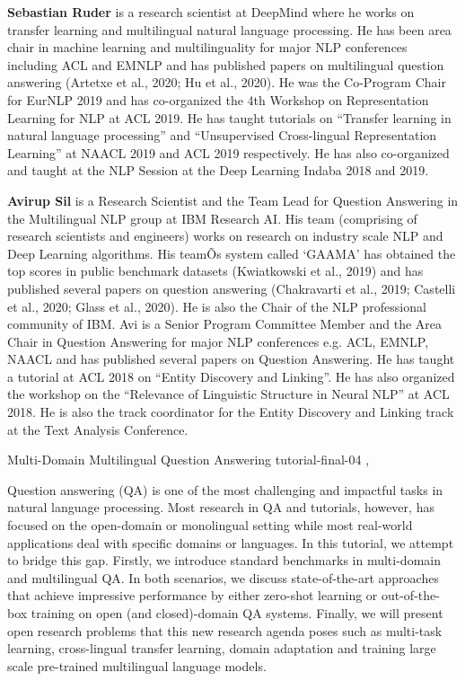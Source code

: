 \begin{bio}
  {\bfseries Sebastian Ruder} is a research scientist at DeepMind where he works on transfer learning and multilingual natural language processing. He has been area chair in machine learning and multilinguality for major NLP conferences including ACL and EMNLP and has published papers on multilingual question answering (Artetxe et al., 2020; Hu et al., 2020). He was the Co-Program Chair for EurNLP 2019 and has co-organized the 4th Workshop on Representation Learning for NLP at ACL 2019. He has taught tutorials on ``Transfer learning in natural language processing'' and ``Unsupervised Cross-lingual Representation Learning'' at NAACL 2019 and ACL 2019 respectively. He has also co-organized and taught at the NLP Session at the Deep Learning Indaba 2018 and 2019.

  {\bfseries Avirup Sil} is a Research Scientist and the Team Lead for Question Answering in the Multilingual NLP group at IBM Research AI. His team (comprising of research scientists and engineers) works on research on industry scale NLP and Deep Learning algorithms. His teamÕs system called `GAAMA' has obtained the top scores in public benchmark datasets (Kwiatkowski et al., 2019) and has published several papers on question answering (Chakravarti et al., 2019; Castelli et al., 2020; Glass et al., 2020). He is also the Chair of the NLP professional community of IBM. Avi is a Senior Program Committee Member and the Area Chair in Question Answering for major NLP conferences e.g. ACL, EMNLP, NAACL and has published several papers on Question Answering. He has taught a tutorial at ACL 2018 on ``Entity Discovery and Linking''. He has also organized the workshop on the ``Relevance of Linguistic Structure in Neural NLP'' at ACL 2018. He is also the track coordinator for the Entity Discovery and Linking track at the Text Analysis Conference.

\end{bio}

\begin{tutorial}
  {Multi-Domain Multilingual Question Answering}
  {tutorial-final-04}
  {\daydateyear, \tutorialmorningtime}
  {\TutLocA}

Question answering (QA) is one of the most challenging and impactful tasks in natural language processing. Most research in QA and tutorials, however, has focused on the open-domain or monolingual setting while most real-world applications deal with specific domains or languages. In this tutorial, we attempt to bridge this gap. Firstly, we introduce standard benchmarks in multi-domain and multilingual QA. In both scenarios, we discuss state-of-the-art approaches that achieve impressive performance by either zero-shot learning or out-of-the-box training on open (and closed)-domain QA systems. Finally, we will present open research problems that this new research agenda poses such as multi-task learning, cross-lingual transfer learning, domain adaptation and training large scale pre-trained multilingual language models.

\end{tutorial}
